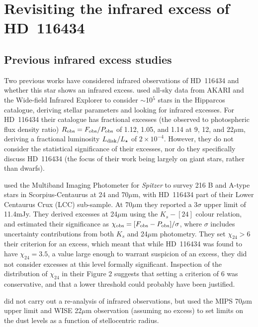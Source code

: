 \documentclass[a4paper,fleqn,usenatbib]{mnras}
\begin{document}
\section{Revisiting the infrared excess of HD~116434}\label{s:hd116434}

\subsection{Previous infrared excess studies}\label{s:hd116434:ss:prev}

Two previous works have considered infrared observations of HD~116434
and whether this star shows an infrared
excess. \cite{2012MNRAS.427..343M} used all-sky data from AKARI
\citep{2010A&A...514A...1I} and the Wide-field Infrared Explorer
\citep[WISE,][]{2010AJ....140.1868W} to consider $\sim$10$^5$ stars in
the Hipparcos catalogue, deriving stellar parameters and looking for
infrared excesses. For HD~116434 their catalogue has fractional excesses
(the observed to photospheric flux density ratio)
$R_{\rm obs} = F_{\rm obs}/P_{\rm obs}$ of 1.12, 1.05, and 1.14 at 9,
12, and 22$\mu$m, deriving a fractional luminosity
$L_{\rm disk}/L_\star$ of $2 \times 10^{-4}$. However, they do not
consider the statistical significance of their excesses, nor do they
specifically discuss HD~116434 (the focus of their work being largely on
giant stars, rather than dwarfs).

\citet{2012ApJ...756..133C} used the Multiband Imaging Photometer for
\emph{Spitzer} \citep[MIPS,][]{2004ApJS..154....1W,2004ApJS..154...25R}
to survey 216 B and A-type stars in Scorpius-Centaurus at 24 and
70$\mu$m, with HD~116434 part of their Lower Centaurus Crux (LCC)
sub-sample. At 70$\mu$m they reported a 3$\sigma$ upper limit of
11.4mJy. They derived excesses at 24$\mu$m using the $K_s - [24]$ colour
relation, and estimated their significance as
$\chi_{\rm obs} = [F_{\rm obs}-P_{\rm obs}]/\sigma$, where $\sigma$
includes uncertainty contributions from both $K_s$ and 24$\mu$m
photometry. They set $\chi_{24} > 6$ their criterion for an excess,
which meant that while HD~116434 was found to have $\chi_{24} = 3.5$, a
value large enough to warrant suspicion of an excess, they did not
consider excesses at this level formally significant. Inspection of the
distribution of $\chi_{24}$ in their Figure 2 suggests that setting a
criterion of 6 was conservative, and that a lower threshold could
probably have been justified.

\citet{2017arXiv170701413C} did not carry out a re-analysis of infrared
observations, but used the MIPS 70$\mu$m upper limit and WISE 22$\mu$m
observation (assuming no excess) to set limits on the dust levels as a
function of stellocentric radius.
\end{document}
